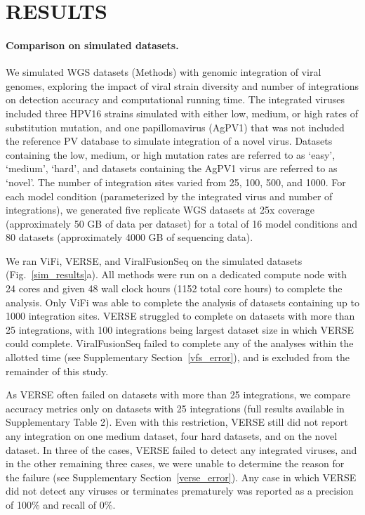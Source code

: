 \documentclass[a4,center,fleqn]{NAR}
\begin{document}
\section{RESULTS}
\paragraph{\textbf{Comparison on simulated datasets.}}  We simulated
WGS datasets (Methods) with genomic integration of viral genomes,
exploring the impact of viral strain diversity and number of
integrations on detection accuracy and computational running time.
The integrated viruses included three HPV16 strains simulated with
either low, medium, or high rates of substitution mutation, and one
papillomavirus (AgPV1) that was not included the reference PV database
to simulate integration of a novel virus.  Datasets containing the low,
medium, or high mutation rates are referred to as `easy', `medium',
`hard', and datasets containing the AgPV1 virus are referred to as
`novel'.  The number of integration sites varied from 25, 100, 500,
and 1000.  For each model condition (parameterized by the integrated
virus and number of integrations), we generated five replicate WGS
datasets at 25x coverage (approximately 50 GB of data per dataset) for
a total of 16 model conditions and 80 datasets (approximately 4000 GB of sequencing data).

We ran ViFi, VERSE, and ViralFusionSeq on the simulated datasets
(Fig.~\ref{sim_results}a).  All methods were run on a dedicated
compute node with 24 cores and given 48 wall clock hours (1152 total core hours) to complete the analysis.  Only ViFi
was able to complete the analysis of datasets containing up to 1000
integration sites.  VERSE struggled to complete on datasets with more than
25 integrations, with 100 integrations being largest dataset size
in which VERSE could complete.  ViralFusionSeq failed to complete any of
the analyses within the allotted time (see
Supplementary Section~\ref{vfs_error}), and is excluded from the remainder of
this study.

As VERSE often failed on datasets with more than 25 integrations, we
compare accuracy metrics only on datasets with 25 integrations (full results available
in Supplementary Table 2).  Even
with this restriction, VERSE still did not report any integration on
one medium dataset, four hard datasets, and on the novel dataset.  In
three of the cases, VERSE failed to detect any integrated viruses, and
in the other remaining three cases, we were unable to determine the
reason for the failure (see Supplementary Section~\ref{verse_error}).  Any case
in which VERSE did not detect any viruses or terminates prematurely
was reported as a precision of 100\% and recall of 0\%.
\end{document}
